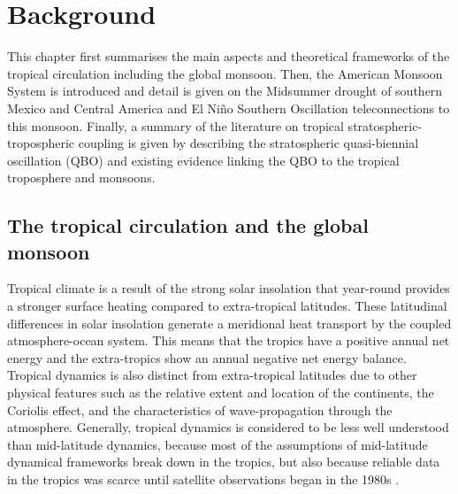 

\chapter{\label{ch:2-litreview}Background}


 This chapter first summarises the main aspects and theoretical frameworks of the tropical circulation including the global monsoon. Then, the American Monsoon System is introduced and detail is given on the Midsummer drought of southern Mexico and Central America and El Niño Southern Oscillation teleconnections to this monsoon. Finally, a summary of the literature on tropical stratospheric-tropospheric coupling is given by describing the stratospheric quasi-biennial oscillation (QBO) and existing evidence linking the QBO to the tropical troposphere and monsoons.
 
\section{The tropical circulation and the global monsoon}\label{sq:bk_tropics}

Tropical climate is a result of the strong solar insolation that year-round provides a stronger surface heating compared to extra-tropical latitudes. These latitudinal differences in  solar insolation generate a meridional heat transport by the coupled atmosphere-ocean system. This means that the tropics have a positive annual net energy and the extra-tropics show an annual negative net energy balance. 
Tropical dynamics is also distinct from extra-tropical latitudes due to other physical features such as the relative extent and location of the continents, the Coriolis effect, and the characteristics of wave-propagation through the atmosphere. 
Generally, tropical dynamics is considered to be less well understood than mid-latitude dynamics, because most of the assumptions of mid-latitude dynamical frameworks break down in the tropics, but also because reliable data in the tropics was scarce until satellite observations began in the 1980s \citep{emanuel2007quasi,webster2020dynamics}.


